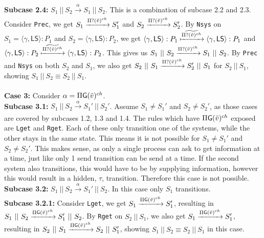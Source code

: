 \indent \textbf{Subcase 2.4:} $S_1 \ || \ S_2 \xrightarrow[]{\alpha} S_1 \ || \ S_2$. This is a combination of subcase 2.2 and 2.3. Consider \texttt{Prec}, we get $S_1 \xrightarrow[]{\Pi ? (\Tilde{v})^{ch}} S_1' $ and $ S_2 \xrightarrow[]{\Pi ? (\Tilde{v})^{ch}} S_2'$. By \texttt{Nsys} on $S_1=\langle \gamma , \mathsf{LS} \rangle : P_1$ and $S_2=\langle \gamma , \mathsf{LS} \rangle : P_2$, we get $\langle \gamma , \mathsf{LS} \rangle : P_1  \xmapsto[]{\widetilde{\Pi ? (\Tilde{v})^{ch}}} \langle \gamma , \mathsf{LS} \rangle : P_1$ and $\langle \gamma , \mathsf{LS} \rangle : P_2  \xmapsto[]{\widetilde{\Pi ? (\Tilde{v})^{ch}}} \langle \gamma , \mathsf{LS} \rangle : P_2$. This gives us $S_1 \ || \ S_2 \xrightarrow[]{\Pi ? (\Tilde{v})^{ch}} S_1 \ || \ S_2$. By \texttt{Prec} and \texttt{Nsys} on both $S_2$ and $S_1$, we also get $S_2 \ || \ S_1 \xrightarrow[]{\Pi ? (\Tilde{v})^{ch}} S_2' \ || \ S_1$ for $S_2\ ||\ S_1$, showing $S_1 \ || \ S_2 \equiv S_2\ ||\ S_1$.\\
\\
\textbf{Case 3: } Consider $\alpha = \Pi \mathsf{G}(\Tilde{v})^{ch}$.\\
\indent \textbf{Subcase 3.1: }$S_1 \ || \ S_2 \xrightarrow[]{\alpha} S_1' \ || \ S_2'$. Assume $S_1\not= S_1'$ and $S_2\not= S_2'$, as those cases are covered by subcases 1.2, 1.3 and 1.4. The rules which have $\Pi \mathsf{G}(\Tilde{v})^{ch}$ exposed are \texttt{Lget} and \texttt{Rget}. Each of these only transition one of the systems, while the other stays in the same state. This means it is not possible for $S_1\not= S_1'$ and $S_2\not= S_2'$. This makes sense, as only a single process can ask to get information at a time, just like only 1 send transition can be send at a time. If the second system also transitions, this would have to be by supplying information, however this would result in a hidden, $\tau$, transition. Therefore this case is not possible.\\
\indent \textbf{Subcase 3.2: }$S_1 \ || \ S_2 \xrightarrow[]{\alpha} S_1' \ || \ S_2$. In this case only $S_1$ transitions. \\
\indent \indent \textbf{Subcase 3.2.1: } Consider \texttt{Lget}, we get $S_1 \xrightarrow[]{\Pi \mathsf{G}(\Tilde{v})^{ch}} S_1'$, resulting in $S_1 \ || \ S_2 \xrightarrow[]{\Pi \mathsf{G}(\Tilde{v})^{ch}} S_1' \ || \ S_2$. By \texttt{Rget} on $S_2\ ||\ S_1$, we also get $S_1 \xrightarrow[]{\Pi \mathsf{G}(\Tilde{v})^{ch}} S_1'$, resulting in $S_2 \ || \ S_1 \xrightarrow[]{\Pi \mathsf{G}(\Tilde{v})^{ch}} S_2 \ || \ S_1'$, showing $S_1 \ || \ S_2 \equiv S_2\ ||\ S_1$ in this case.\\ 
